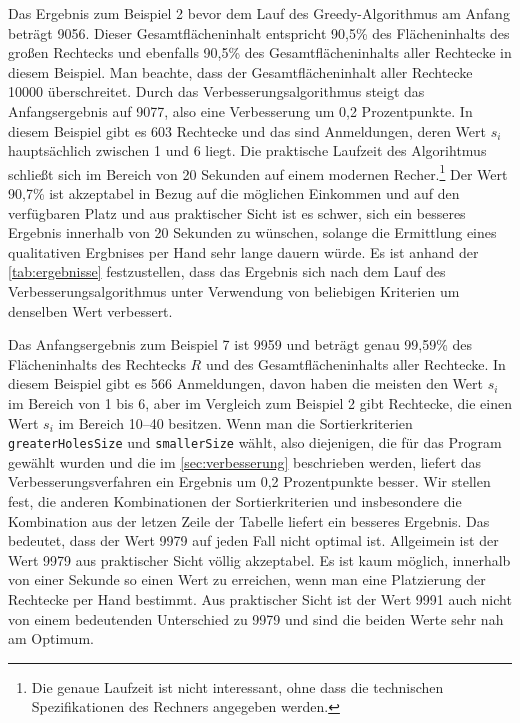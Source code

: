 Das Ergebnis zum Beispiel 2 bevor dem Lauf des Greedy-Algorithmus am Anfang 
beträgt 9056. Dieser Gesamtflächeninhalt entspricht 90,5\% des Flächeninhalts des
großen Rechtecks und ebenfalls 90,5\% des Gesamtflächeninhalts aller Rechtecke in diesem Beispiel.
Man beachte, dass der Gesamtflächeninhalt aller Rechtecke 10000 überschreitet.
Durch das Verbesserungsalgorithmus steigt das Anfangsergebnis auf 9077,
also eine Verbesserung um 0,2 Prozentpunkte.
In diesem Beispiel gibt es 603 Rechtecke und das sind Anmeldungen, deren Wert $s_i$ hauptsächlich zwischen 
1 und 6 liegt. Die praktische Laufzeit des Algorihtmus schließt sich im Bereich von 20 Sekunden
auf einem modernen Recher.\footnote{Die genaue Laufzeit ist nicht interessant, ohne dass die 
technischen Spezifikationen des Rechners angegeben werden.}
Der Wert 90,7\% ist akzeptabel in Bezug auf die möglichen Einkommen und auf den verfügbaren Platz
und aus praktischer Sicht ist es schwer, sich ein besseres Ergebnis innerhalb von 20 Sekunden zu wünschen,
solange die Ermittlung eines qualitativen Ergbnises per Hand sehr lange dauern würde.
Es ist anhand der \cref{tab:ergebnisse} festzustellen, dass das Ergebnis sich nach dem Lauf des
Verbesserungsalgorithmus unter Verwendung von beliebigen Kriterien um denselben Wert verbessert.

Das Anfangsergebnis zum Beispiel 7 ist 9959 und beträgt genau 99,59\% des Flächeninhalts
des Rechtecks $R$ und des Gesamtflächeninhalts aller Rechtecke. In diesem Beispiel
gibt es 566 Anmeldungen, davon haben die meisten den Wert $s_i$ im Bereich von 1 bis 6, aber
im Vergleich zum Beispiel 2 gibt Rechtecke, die einen Wert $s_i$ im Bereich 10--40 besitzen.
Wenn man die Sortierkriterien \texttt{greaterHolesSize} und \texttt{smallerSize} wählt,
also diejenigen, die für das Program gewählt wurden und die im \cref{sec:verbesserung} beschrieben werden,
liefert das Verbesserungsverfahren ein Ergebnis um 0,2 Prozentpunkte besser.
Wir stellen fest, die anderen Kombinationen der Sortierkriterien und insbesondere die Kombination
aus der letzen Zeile der Tabelle liefert ein besseres Ergebnis.
Das bedeutet, dass der Wert 9979 auf jeden Fall nicht optimal ist. 
Allgeimein ist der Wert 9979 aus praktischer Sicht völlig akzeptabel.
Es ist kaum möglich, innerhalb von einer Sekunde so einen Wert zu erreichen,
wenn man eine Platzierung der Rechtecke per Hand bestimmt.
Aus praktischer Sicht ist der Wert 9991 auch nicht von einem bedeutenden Unterschied zu 9979 und
sind die beiden Werte sehr nah am Optimum.

